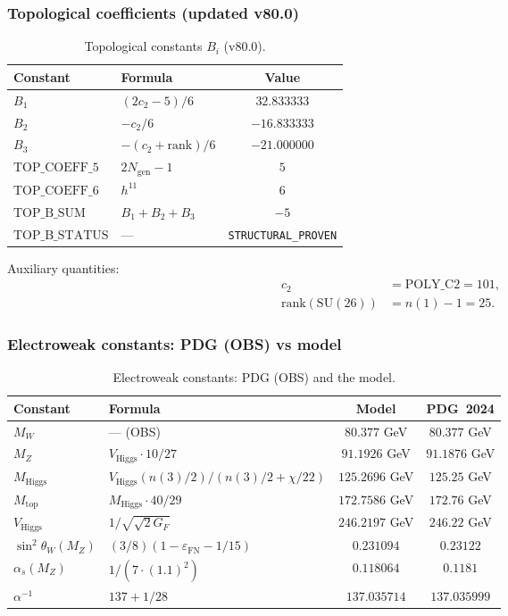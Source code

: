 \documentclass[11pt,a4paper]{article}
\newcommand{\SU}{\ensuremath{\mathrm{SU}}}
\newcommand{\Ngen}{\ensuremath{N_{\text{gen}}}}
\theoremstyle{definition}
\begin{document}
\subsubsection{Topological coefficients (updated v80.0)}

\begin{table}[ht]
\centering
\caption{Topological constants \texorpdfstring{$B_i$}{B\_i} (v80.0).}
\label{tab:app-bi-v80}
\begin{tabular}{llc}
\toprule
Constant & Formula & Value \\
\midrule
$B_1$ & $(2 c_2 - 5)/6$ & $32.833333$ \\
$B_2$ & $-c_2/6$ & $-16.833333$ \\
$B_3$ & $-(c_2 + \text{rank})/6$ & $-21.000000$ \\
\midrule
$\text{TOP\_COEFF\_5}$ & $2 \Ngen - 1$ & $5$ \\
$\text{TOP\_COEFF\_6}$ & $h^{11}$ & $6$ \\
$\text{TOP\_B\_SUM}$ & $B_1 + B_2 + B_3$ & $-5$ \\
$\text{TOP\_B\_STATUS}$ & --- & \texttt{STRUCTURAL\_PROVEN} \\
\bottomrule
\end{tabular}
\end{table}
\medskip\noindent
Auxiliary quantities:
\begin{align}
    c_2 &= \text{POLY\_C2} = 101, \\
    \text{rank}(\SU(26)) &= n(1) - 1 = 25.
\end{align}

\subsubsection{Electroweak constants: PDG (OBS) vs model}

\begin{table}[ht]
\centering
\caption{Electroweak constants: PDG (OBS) and the model.}
\label{tab:app-ew}
\begin{tabular}{llcc}
\toprule
Constant & Formula & Model & PDG~2024 \\
\midrule
$M_W$ & — (OBS) & $80.377$ GeV & $80.377$ GeV \\
$M_Z$ & $V_{\text{Higgs}} \cdot 10/27$ & $91.1926$ GeV & $91.1876$ GeV \\
$M_{\text{Higgs}}$ & $V_{\text{Higgs}}(n(3)/2)/(n(3)/2+\chi/22)$
    & $125.2696$ GeV & $125.25$ GeV \\
$M_{\text{top}}$ & $M_{\text{Higgs}} \cdot 40/29$ & $172.7586$ GeV & $172.76$ GeV \\
$V_{\text{Higgs}}$ & $1/\sqrt{\sqrt{2} G_F}$ & $246.2197$ GeV & $246.22$ GeV \\
$\sin^2\theta_W(M_Z)$ & $(3/8)(1 - \varepsilon_{\text{FN}} - 1/15)$
    & $0.231094$ & $0.23122$ \\
$\alpha_s(M_Z)$ & $1/(7 \cdot (1.1)^2)$ & $0.118064$ & $0.1181$ \\
$\alpha^{-1}$ & $137 + 1/28$ & $137.035714$ & $137.035999$ \\
\bottomrule
\end{tabular}
\end{table}
\end{document}
